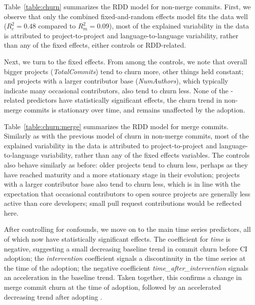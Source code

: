 Table~\ref{table:churn} summarizes the RDD model for non-merge commits.
First, we observe that only the combined fixed-and-random effects model fits the 
data well ($R_c^2 = 0.48$ compared to $R_m^2 = 0.09$), \ie most of the explained 
variability in the data is attributed to project-to-project and language-to-language
variability, rather than any of the fixed effects, either controls or RDD-related.

Next, we turn to the fixed effects.
From among the controls, we note that overall bigger projects (\emph{TotalCommits}) 
tend to churn more, other things held constant; and projects with a larger contributor 
base (\emph{NumAuthors}), which typically indicate many occasional contributors, 
also tend to churn less.
None of the \Tvi-related predictors have statistically significant effects,
\ie the churn trend in non-merge commits is stationary over time, and 
remains unaffected by the \Tvis adoption.

Table~\ref{table:churn:merge} summarizes the RDD model for merge commits.
Similarly as with the previous model of churn in non-merge commits, most of 
the explained variability in the data is attributed to project-to-project and 
language-to-language variability, rather than any of the fixed effects variables.
The controls also behave similarly as before: older projects tend to churn less, 
perhaps as they have reached maturity and a more stationary stage in their 
evolution; projects with a larger contributor base also tend to churn less, which 
is in line with the expectation that occasional contributors to open source projects 
are generally less active than core developers; small pull request contributions
would be reflected here.

After controlling for confounds, we move on to the main time series predictors,
all of which now have statistically significant effects.
The coefficient for \emph{time} is negative, suggesting a small decreasing
baseline trend in commit churn before CI adoption; the \emph{intervention}
coefficient signals a discontinuity in the time series at the time of the \Tvis
adoption; the negative coefficient \emph{time\_after\_intervention} signals
an acceleration in the baseline trend.
Taken together, this confirms a change in merge commit churn at the time 
of adoption, followed by an accelerated decreasing trend after adopting \Tvis.

